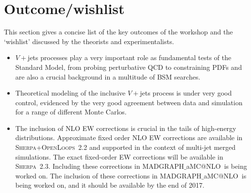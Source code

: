 \documentclass[a4paper,11pt,notoc]{article}
\makeatletter
\newcommand{\SHERPA}{\textsc{Sherpa}}
\newcommand{\OPENLOOPS}{\textsc{OpenLoops}}
\newcommand{\MGNLO}{MADGRAPH$\_$aMC@NLO}
\makeatother
\begin{document}
\section{Outcome/wishlist}
This section gives a concise list of the key outcomes of the workshop and the `wishlist' discussed by the theorists and experimentalists. 
\begin{itemize}
\item $V+$jets processes play a very important role as fundamental tests of the Standard Model, from probing perturbative QCD to constraining PDFs and are also a crucial background in a multitude of BSM searches.
\item Theoretical modeling of the inclusive $V+$jets process is under very good control, evidenced by the very good agreement between data and simulation for a range of different Monte Carlos.
\item The inclusion of NLO EW corrections is crucial in the tails of high-energy distributions. Approximate fixed order NLO EW corrections are available in \SHERPA+\OPENLOOPS\ 2.2 and supported in the context of multi-jet merged simulations. The exact fixed-order EW corrections will be available in \SHERPA\ 2.3. Including these corrections in \MGNLO\ is being worked on. The inclusion of these corrections in \MGNLO\ is being worked on, and it should be available by the end of 2017.


\end{itemize}
\end{document}
